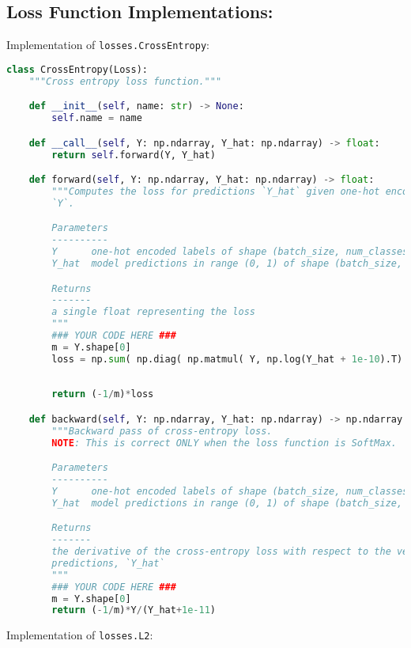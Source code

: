 \subsection{Loss Function Implementations:}

Implementation of \texttt{losses.CrossEntropy}:

\begin{lstlisting}[language=Python]
class CrossEntropy(Loss):
    """Cross entropy loss function."""

    def __init__(self, name: str) -> None:
        self.name = name

    def __call__(self, Y: np.ndarray, Y_hat: np.ndarray) -> float:
        return self.forward(Y, Y_hat)

    def forward(self, Y: np.ndarray, Y_hat: np.ndarray) -> float:
        """Computes the loss for predictions `Y_hat` given one-hot encoded labels
        `Y`.

        Parameters
        ----------
        Y      one-hot encoded labels of shape (batch_size, num_classes)
        Y_hat  model predictions in range (0, 1) of shape (batch_size, num_classes)

        Returns
        -------
        a single float representing the loss
        """
        ### YOUR CODE HERE ###
        m = Y.shape[0]
        loss = np.sum( np.diag( np.matmul( Y, np.log(Y_hat + 1e-10).T) ) )
        
        
        return (-1/m)*loss

    def backward(self, Y: np.ndarray, Y_hat: np.ndarray) -> np.ndarray:
        """Backward pass of cross-entropy loss.
        NOTE: This is correct ONLY when the loss function is SoftMax.

        Parameters
        ----------
        Y      one-hot encoded labels of shape (batch_size, num_classes)
        Y_hat  model predictions in range (0, 1) of shape (batch_size, num_classes)

        Returns
        -------
        the derivative of the cross-entropy loss with respect to the vector of
        predictions, `Y_hat`
        """
        ### YOUR CODE HERE ###
        m = Y.shape[0]
        return (-1/m)*Y/(Y_hat+1e-11)

\end{lstlisting}

Implementation of \texttt{losses.L2}:

